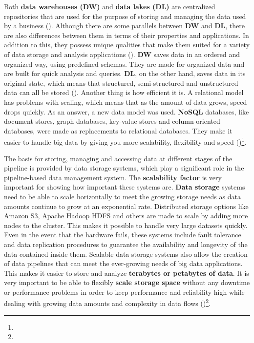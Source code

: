 Both\textbf{ data warehouses (DW)} and \textbf{data lakes (DL)} are centralized repositories that are used for the purpose of storing and managing the data used by a business (\cite{Nambiar2022AnOO})\footnotemark[20]. Although there are some parallels between \textbf{DW} and \textbf{DL}, there are also differences between them in terms of their properties and applications. In addition to this, they possess unique qualities that make them suited for a variety of data storage and analysis applications (\cite{Nambiar2022AnOO})\footnotemark[20]. \textbf{DW} saves data in an ordered and organized way, using predefined schemas. They are made for organized data and are built for quick analysis and queries. \textbf{DL}, on the other hand, saves data in its original state, which means that structured, semi-structured and unstructured data can all be stored (\cite{Nambiar2022AnOO})\footnotemark[20]. Another thing is how efficient it is. A relational model has problems with scaling, which means that as the amount of data grows, speed drops quickly. As an answer, a new data model was used. \textbf{NoSQL} databases, like document stores, graph databases, key-value stores and column-oriented databases, were made as replacements to relational databases. They make it easier to handle big data by giving you more scalability, flexibility and speed (\cite{Nayak2013TypeON})\footnote[21]{}.

The basis for storing, managing and accessing data at different stages of the pipeline is provided by data storage systems, which play a significant role in the pipeline-based data management system. The \textbf{scalability factor} is very important for showing how important these systems are. \textbf{Data storage} systems need to be able to scale horizontally to meet the growing storage needs as data amounts continue to grow at an exponential rate. Distributed storage options like Amazon S3, Apache Hadoop HDFS and others are made to scale by adding more nodes to the cluster. This makes it possible to handle very large datasets quickly. Even in the event that the hardware fails, these systems include fault tolerance and data replication procedures to guarantee the availability and longevity of the data contained inside them. Scalable data storage systems also allow the creation of data pipelines that can meet the ever-growing needs of big data applications. This makes it easier to store and analyze \textbf{terabytes or petabytes of data}. It is very important to be able to flexibly \textbf{scale storage space} without any downtime or performance problems in order to keep performance and reliability high while dealing with growing data amounts and complexity in data flows (\cite{Nambiar2022AnOO})\footnote[20]{}.


